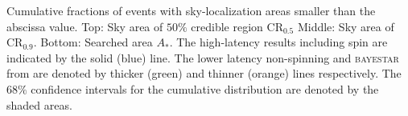 \label{fig:sky} Cumulative fractions of events with sky-localization areas smaller than the abscissa value. Top: Sky area of $50\%$ credible region $\mathrm{CR}_{0.5}$ Middle: Sky area of $\mathrm{CR}_{0.9}$. Bottom: Searched area $A_\ast$. The high-latency results including spin are indicated by the solid (blue) line. The lower latency non-spinning and \textsc{bayestar} from \citet{Singer_2014} are denoted by thicker (green) and thinner (orange) lines respectively. The $68\%$ confidence intervals for the cumulative distribution are denoted by the shaded areas.
  